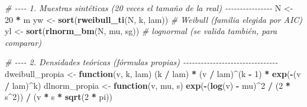 \documentclass[
  spanish,
]{article}
\newenvironment{Shaded}{\begin{snugshade}}{\end{snugshade}}
\newcommand{\CommentTok}[1]{\textcolor[rgb]{0.56,0.35,0.01}{\textit{#1}}}
\newcommand{\ControlFlowTok}[1]{\textcolor[rgb]{0.13,0.29,0.53}{\textbf{#1}}}
\newcommand{\DecValTok}[1]{\textcolor[rgb]{0.00,0.00,0.81}{#1}}
\newcommand{\FunctionTok}[1]{\textcolor[rgb]{0.13,0.29,0.53}{\textbf{#1}}}
\newcommand{\NormalTok}[1]{#1}
\newcommand{\OtherTok}[1]{\textcolor[rgb]{0.56,0.35,0.01}{#1}}
\newcommand{\SpecialCharTok}[1]{\textcolor[rgb]{0.81,0.36,0.00}{\textbf{#1}}}
\begin{document}
\begin{Shaded}
\begin{Highlighting}[]
\CommentTok{\# {-}{-}{-}{-} 1. Muestras sintéticas (20 veces el tamaño de la real) {-}{-}{-}{-}{-}{-}{-}{-}{-}{-}{-}{-}{-}{-}{-}{-}}
\NormalTok{N  }\OtherTok{\textless{}{-}} \DecValTok{20} \SpecialCharTok{*}\NormalTok{ m}
\NormalTok{yw }\OtherTok{\textless{}{-}} \FunctionTok{sort}\NormalTok{(}\FunctionTok{rweibull\_ti}\NormalTok{(N, k, lam))              }\CommentTok{\# Weibull (familia elegida por AIC)}
\NormalTok{yl }\OtherTok{\textless{}{-}} \FunctionTok{sort}\NormalTok{(}\FunctionTok{rlnorm\_bm}\NormalTok{(N, mu, sg))                }\CommentTok{\# lognormal (se valida también, para comparar)}

\CommentTok{\# {-}{-}{-}{-} 2. Densidades teóricas (fórmulas propias) {-}{-}{-}{-}{-}{-}{-}{-}{-}{-}{-}{-}{-}{-}{-}{-}{-}{-}{-}{-}{-}{-}{-}{-}{-}{-}{-}{-}{-}{-}{-}{-}}
\NormalTok{dweibull\_propia }\OtherTok{\textless{}{-}} \ControlFlowTok{function}\NormalTok{(v, k, lam) (k }\SpecialCharTok{/}\NormalTok{ lam) }\SpecialCharTok{*}\NormalTok{ (v }\SpecialCharTok{/}\NormalTok{ lam)}\SpecialCharTok{\^{}}\NormalTok{(k }\SpecialCharTok{{-}} \DecValTok{1}\NormalTok{) }\SpecialCharTok{*} \FunctionTok{exp}\NormalTok{(}\SpecialCharTok{{-}}\NormalTok{(v }\SpecialCharTok{/}\NormalTok{ lam)}\SpecialCharTok{\^{}}\NormalTok{k)}
\NormalTok{dlnorm\_propia   }\OtherTok{\textless{}{-}} \ControlFlowTok{function}\NormalTok{(v, mu, s) }\FunctionTok{exp}\NormalTok{(}\SpecialCharTok{{-}}\NormalTok{(}\FunctionTok{log}\NormalTok{(v) }\SpecialCharTok{{-}}\NormalTok{ mu)}\SpecialCharTok{\^{}}\DecValTok{2} \SpecialCharTok{/}\NormalTok{ (}\DecValTok{2} \SpecialCharTok{*}\NormalTok{ s}\SpecialCharTok{\^{}}\DecValTok{2}\NormalTok{)) }\SpecialCharTok{/}\NormalTok{ (v }\SpecialCharTok{*}\NormalTok{ s }\SpecialCharTok{*} \FunctionTok{sqrt}\NormalTok{(}\DecValTok{2} \SpecialCharTok{*}\NormalTok{ pi))}


\end{Highlighting}
\end{Shaded}
\end{document}
